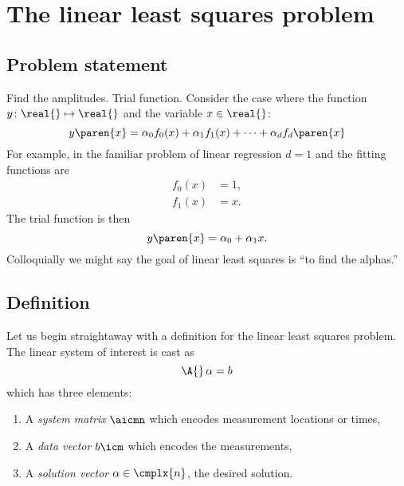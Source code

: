 \chapter{The linear least squares problem}

\section*{Problem statement}
Find the amplitudes.
Trial function. Consider the case where the function $y\colon\real{}\mapsto\real{}$ and the variable $x\in\real{}$:
  \begin{equation}
      y\paren{x} = \alpha_{0} f_{0}(x) + \alpha_{1} f_{1}(x) + \cdots + \alpha_{d} f_{d}\paren{x}
    \label{eqn:generic trial function}
  \end{equation}
For example, in the familiar problem of linear regression $d=1$ and the fitting functions are 
  \begin{equation}
    \begin{split}
      f_{0}(x) &= 1, \\
      f_{1}(x) &= x.
    \end{split}
  \end{equation}
The trial function is then
  \begin{equation}
      y\paren{x} = \alpha_{0} + \alpha_{1} x.
  \end{equation}
Colloquially we might say the goal of linear least squares is ``to find the alphas.''

\section{Definition}  %
Let us begin straightaway with a definition for the linear least squares problem. The linear system of interest is cast as
  \begin{equation}
    \A{}\, \alpha = b
    \label{eqn:ax=b}
  \end{equation}
which has three elements:
\begin{enumerate}
\item A \emph{system matrix} $\aicmn$ which encodes measurement locations or times,
\item A \emph{data vector} $b \icm$ which encodes the measurements, 
\item A \emph{solution vector} $\alpha\in\cmplx{n}$, the desired solution.
\end{enumerate}

